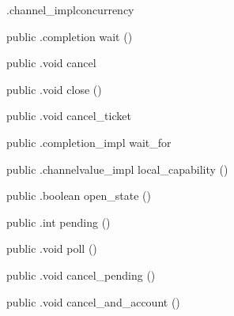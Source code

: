 \begin{CrexxClass}{.channel\_impl}{concurrency}
\begin{Members}
    \Method
      {public}
      {.completion}
      {wait}
      {()}

    \Method
      {public}
      {.void}
      {cancel}
      {}

    \Method
      {public}
      {.void}
      {close}
      {()}

    \Method
      {public}
      {.void}
      {cancel\_ticket}
      {}

    \Method
      {public}
      {.completion\_impl}
      {wait\_for}
      {}

    \Method
      {public}
      {.channelvalue\_impl}
      {local\_capability}
      {()}

    \Method
      {public}
      {.boolean}
      {open\_state}
      {()}

    \Method
      {public}
      {.int}
      {pending}
      {()}

    \Method
      {public}
      {.void}
      {poll}
      {()}

    \Method
      {public}
      {.void}
      {cancel\_pending}
      {()}

    \Method
      {public}
      {.void}
      {cancel\_and\_account}
      {()}

  \end{Members}
\end{CrexxClass}

